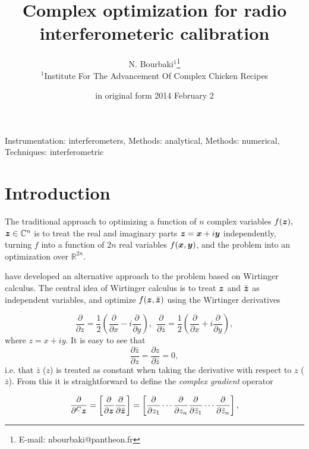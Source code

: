 \documentclass[useAMS,usenatbib]{mn2e}
\title[Complex optimization for radio interferometeric calibration]{Complex optimization for radio interferometeric calibration}
\author[N. Bourbaki]{N. Bourbaki$^1$\thanks{E-mail: nbourbaki@pantheon.fr}\\ 
$^1$Institute For The Advancement Of Complex Chicken Recipes}
\newcommand{\CC}{\mathbb{C}}
\newcommand{\RR}{\mathbb{R}}
\newcommand{\zz}{\bmath{z}}
\begin{document}
\date{in original form 2014 February 2}

\pagerange{\pageref{firstpage}--\pageref{lastpage}} 

\maketitle

\label{firstpage}

\begin{abstract}
\end{abstract}

\begin{keywords}
Instrumentation: interferometers, Methods: analytical, Methods: numerical, Techniques: interferometric
\end{keywords}

\section{Introduction}

The traditional approach to optimizing a function of $n$ complex variables $f(\zz),$ $\zz\in\CC^n$ is
to treat the real and imaginary parts $\zz=\bmath{x}+i\bmath{y}$ independently, turning $f$ into a function
of $2n$ real variables $f(\bmath{x},\bmath{y})$, and the problem into an optimization over $\RR^{2n}$.

\citet{ComplexOpt} have developed an alternative approach to the problem based on Wirtinger calculus. The central idea
of Wirtinger calculus is to treat $\zz$ and $\bar{\zz}$ as independent variables, and optimize $f(\zz,\bar{\zz})$
using the Wirtinger derivatives 

\[
\frac{\partial}{\partial z} = \frac{1}{2}\left ( \frac{\partial}{\partial x} - i\frac{\partial}{\partial y} \right),~~
\frac{\partial}{\partial \bar{z}} = \frac{1}{2}\left ( \frac{\partial}{\partial x} + i\frac{\partial}{\partial y} \right),
\]
where $z=x+iy$. It is easy to see that  
\[
\frac{\partial \bar z}{\partial z} = 
\frac{\partial z}{\partial \bar z} = 0,
\]
i.e. that $\bar z$ ($z$) is treated as constant when taking the derivative with respect to $z$ ($\bar z$). From this 
it is straightforward to define the \emph{complex gradient} operator 

\[
\frac{\partial}{\partial^C \zz} = \left [ \frac{\partial}{\partial \zz} \frac{\partial}{\partial \bar{\zz}} \right ] = \left [ \frac{\partial}{\partial z_1} \cdots \frac{\partial}{\partial z_n}
\frac{\partial}{\partial \bar{z}_1} \cdots \frac{\partial}{\partial \bar{z}_n} \right ],
\]
\end{document}
